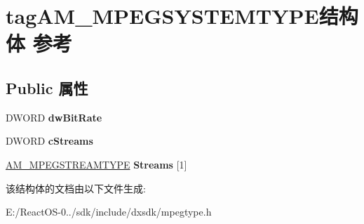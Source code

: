 \hypertarget{structtag_a_m___m_p_e_g_s_y_s_t_e_m_t_y_p_e}{}\section{tag\+A\+M\+\_\+\+M\+P\+E\+G\+S\+Y\+S\+T\+E\+M\+T\+Y\+P\+E结构体 参考}
\label{structtag_a_m___m_p_e_g_s_y_s_t_e_m_t_y_p_e}
\subsection*{Public 属性}
\begin{DoxyCompactItemize}
\item 
\mbox{\label{structtag_a_m___m_p_e_g_s_y_s_t_e_m_t_y_p_e_a59896ba87eb10096398de9db85564c02}} 
D\+W\+O\+RD {\bfseries dw\+Bit\+Rate}
\item 
\mbox{\label{structtag_a_m___m_p_e_g_s_y_s_t_e_m_t_y_p_e_ae4c3e8d047a640a312a946302dec451c}} 
D\+W\+O\+RD {\bfseries c\+Streams}
\item 
\mbox{\label{structtag_a_m___m_p_e_g_s_y_s_t_e_m_t_y_p_e_a56f2a7fd1bd837d02a0c9025d3e4a297}} 
\hyperlink{structtag_a_m___m_p_e_g_s_t_r_e_a_m_t_y_p_e}{A\+M\+\_\+\+M\+P\+E\+G\+S\+T\+R\+E\+A\+M\+T\+Y\+PE} {\bfseries Streams} \mbox{[}1\mbox{]}
\end{DoxyCompactItemize}


该结构体的文档由以下文件生成\+:\begin{DoxyCompactItemize}
\item 
E\+:/\+React\+O\+S-\/0../sdk/include/dxsdk/mpegtype.\+h\end{DoxyCompactItemize}
